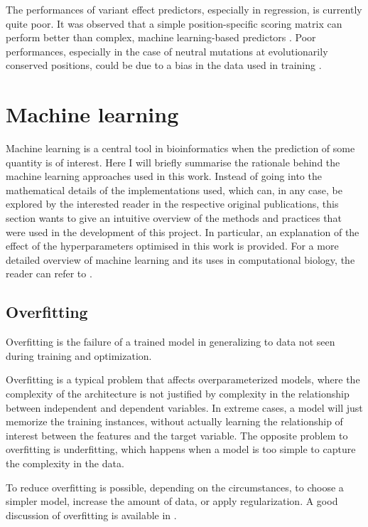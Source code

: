 The performances of variant effect predictors, especially in regression, is currently quite poor.
It was observed that a simple position-specific scoring matrix can perform better than complex, machine learning-based predictors \parencite{Reeb2020}.
Poor performances, especially in the case of neutral mutations at evolutionarily conserved positions, could be due to a bias in the data used in training \parencite{Liu2013}.

\section{Machine learning}
Machine learning is a central tool in bioinformatics when the prediction of some quantity is of interest.
Here I will briefly summarise the rationale behind the machine learning approaches used in this work.
Instead of going into the mathematical details of the implementations used, which can, in any case, be explored by the interested reader in the respective original publications, this section wants to give an intuitive overview of the methods and practices that were used in the development of this project.
In particular, an explanation of the effect of the hyperparameters optimised in this work is provided.
For a more detailed overview of machine learning and its uses in computational biology, the reader can refer to \textcite{Chicco2017}.

\subsection{Overfitting}
Overfitting is the failure of a trained model in generalizing to data not seen during training and optimization.

Overfitting is a typical problem that affects overparameterized models, where the complexity of the architecture is not justified by complexity in the relationship between independent and dependent variables.
In extreme cases, a model will just memorize the training instances, without actually learning the relationship of interest between the features and the target variable.
The opposite problem to overfitting is underfitting, which happens when a model is too simple to capture the complexity in the data.

To reduce overfitting is possible, depending on the circumstances, to choose a simpler model, increase the amount of data, or apply regularization.
A good discussion of overfitting is available in \textcite{Chicco2017}.

